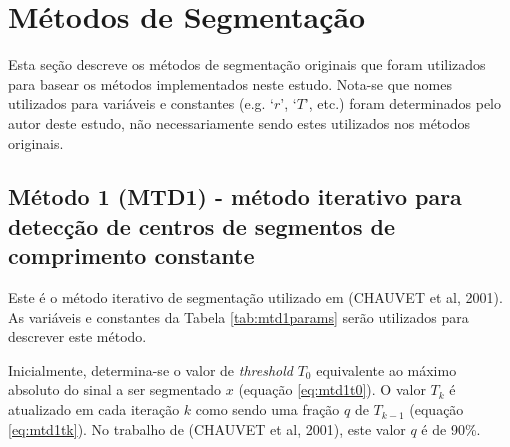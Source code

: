 \documentclass[
	12pt,				%
	openright,			%
	oneside,
	a4paper,			%
	english,			%
	francais,			%
	spanish,			%
	brazil				%
	]{abntex2}
\begin{document}
\section{Métodos de Segmentação}

	Esta seção descreve os métodos de segmentação originais que foram utilizados para basear os métodos implementados neste estudo. Nota-se que nomes utilizados para variáveis e constantes (e.g. `$r$', `$T$', etc.) foram determinados pelo autor deste estudo, não necessariamente sendo estes utilizados nos métodos originais.
	
\subsection{Método 1 (MTD1) - método iterativo para detecção de centros de segmentos de comprimento constante}

	Este é o método iterativo de segmentação utilizado em (CHAUVET et al, 2001). As variáveis e constantes da Tabela \ref{tab:mtd1params} serão utilizados para descrever este método.
	
\begin{table}[htb]
\end{table}
	
	Inicialmente, determina-se o valor de \emph{threshold} $T_0$ equivalente ao máximo absoluto do sinal a ser segmentado $x$ (equação \ref{eq:mtd1t0}). O valor $T_k$ é atualizado em cada iteração $k$ como sendo uma fração $q$ de $T_{k-1}$ (equação \ref{eq:mtd1tk}). No trabalho de (CHAUVET et al, 2001), este valor $q$ é de 90\%.
	
\end{document}
